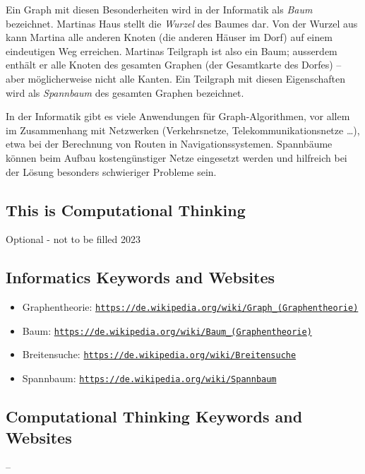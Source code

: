 \documentclass[a4paper,11pt]{report}
\newcommand{\BrochureUrlText}[1]{\texttt{#1}}
\begin{document}
Ein Graph mit diesen Besonderheiten wird in der Informatik als \emph{Baum} bezeichnet. Martinas Haus stellt die \emph{Wurzel} des Baumes dar. Von der Wurzel aus kann Martina alle anderen Knoten (die anderen Häuser im Dorf) auf einem eindeutigen Weg erreichen.  Martinas Teilgraph ist also ein Baum; ausserdem enthält er alle Knoten des gesamten Graphen (der Gesamtkarte des Dorfes) – aber möglicherweise nicht alle Kanten. Ein Teilgraph mit diesen Eigenschaften wird als \emph{Spannbaum} des gesamten Graphen bezeichnet.

In der Informatik gibt es viele Anwendungen für Graph-Algorithmen, vor allem im Zusammenhang mit Netzwerken (Verkehrsnetze, Telekommunikationsnetze …), etwa bei der Berechnung von Routen in Navigationssystemen.  Spannbäume können beim Aufbau kostengünstiger Netze eingesetzt werden und hilfreich bei der Lösung besonders schwieriger Probleme sein.


\subsection*{This is Computational Thinking}

Optional - not to be filled 2023


\subsection*{Informatics Keywords and Websites}

\begin{itemize}
  \item Graphentheorie: \href{https://de.wikipedia.org/wiki/Graph_(Graphentheorie)}{\BrochureUrlText{https://de.wikipedia.org/wiki/Graph\_(Graphentheorie)}}
  \item Baum: \href{https://de.wikipedia.org/wiki/Baum_(Graphentheorie)}{\BrochureUrlText{https://de.wikipedia.org/wiki/Baum\_(Graphentheorie)}}
  \item Breitensuche: \href{https://de.wikipedia.org/wiki/Breitensuche}{\BrochureUrlText{https://de.wikipedia.org/wiki/Breitensuche}}
  \item Spannbaum: \href{https://de.wikipedia.org/wiki/Spannbaum}{\BrochureUrlText{https://de.wikipedia.org/wiki/Spannbaum}}
\end{itemize}


\subsection*{Computational Thinking Keywords and Websites}

–
\end{document}
